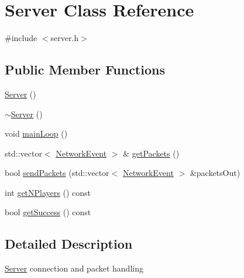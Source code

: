 \hypertarget{class_server}{\section{Server Class Reference}
\label{class_server}
}


{\ttfamily \#include $<$server.\-h$>$}

\subsection*{Public Member Functions}
\begin{DoxyCompactItemize}
\item 
\hyperlink{class_server_ad5ec9462b520e59f7ea831e157ee5e59}{Server} ()
\item 
\hyperlink{class_server_a4b3aa2579cb1c8cd1d069582c14d0fa6}{$\sim$\-Server} ()
\item 
void \hyperlink{class_server_a9bdb42db12b75864979c7849c7ee7e9f}{main\-Loop} ()
\item 
std\-::vector$<$ \hyperlink{class_network_event}{Network\-Event} $>$ \& \hyperlink{class_server_ab7a40e988d00c41aa558ae6a2fb40f3d}{get\-Packets} ()
\item 
bool \hyperlink{class_server_a7b8a575b6e81bad1ed19fd8c8a5521b7}{send\-Packets} (std\-::vector$<$ \hyperlink{class_network_event}{Network\-Event} $>$ \&packets\-Out)
\item 
int \hyperlink{class_server_a256b5201b2f86228bfd7c236052422ef}{get\-N\-Players} () const 
\item 
bool \hyperlink{class_server_a815380c1592595b777a7c6264d0cebd0}{get\-Success} () const 
\end{DoxyCompactItemize}


\subsection{Detailed Description}
\hyperlink{class_server}{Server} connection and packet handling 

